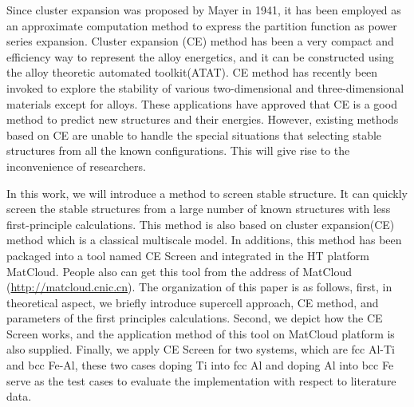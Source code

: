 \documentclass[aps,preprint,amsmath,amssymb]{revtex4}
\begin{document}
Since cluster expansion was proposed by Mayer in 1941, it has been employed as an approximate
computation method to express the partition function as power series expansion\cite{Wu2016}.
Cluster expansion (CE) method has been a very compact and efficiency way to represent the alloy energetics\cite{Chakraborty2010},
and it can be constructed using the alloy theoretic automated toolkit(ATAT)\cite{VandeWalle2002}.
CE method has recently been invoked to explore the stability of various two-dimensional and three-dimensional materials
except for alloys\cite{Ravi2010,Penev2012,Li2014,Kutana2014}.
These applications have approved that CE is a good method to predict new structures and their energies.
However, existing methods based on CE are unable to handle the special situations that selecting stable structures from all the known configurations.
This will give rise to the inconvenience of researchers.

In this work, we will introduce a method to screen stable structure.
It can quickly screen the stable structures from
a large number of known structures with less first-principle calculations.
This method is also based on cluster expansion(CE) method which is a classical multiscale model.
In additions, this method has been packaged into a tool named CE Screen and integrated in the HT platform MatCloud.
People also can get this tool from the address of MatCloud (\url{http://matcloud.cnic.cn}).
The organization of this paper is as follows,
first, in theoretical aspect, we briefly introduce supercell approach, CE method, and
parameters of the first principles calculations.
Second, we depict how the CE Screen works,
and the application method of this tool on MatCloud platform is also supplied.
Finally, we apply CE Screen for two systems, which are fcc Al-Ti and bcc Fe-Al, these two cases
doping Ti into fcc Al and doping Al into bcc Fe serve as the test
cases to evaluate the implementation with respect to literature data.
\end{document}
